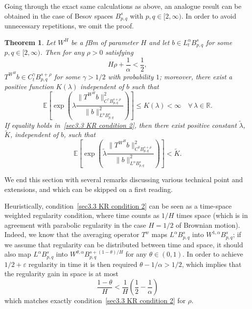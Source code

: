 \documentclass[10pt]{article}
\newtheorem{theorem}{Theorem}
\begin{document}
Going through the exact same calculations as above, an analogue result can be
obtained in the case of Besov spaces $B^s_{p, q}$ with $p, q \in [2, \infty)$.
In order to avoid unnecessary repetitions, we omit the proof.

\begin{theorem}
  \label{sec3.3 thm averaging besov}Let $W^H$ be a fBm of parameter $H$ and
  let $b \in L^{\alpha}_t B^s_{p, q}$ for some $p, q \in [2, \infty)$. Then
  for any $\rho > 0$ satisfying
  \begin{equation}
    H \rho + \frac{1}{\alpha} < \frac{1}{2}, \label{sec3.3 KR condition 2}
  \end{equation}
  $T^{W^H} b \in C^{\gamma}_t B^{s + \rho}_{p, q}$ for some $\gamma > 1 / 2$
  with probability $1$; moreover, there exist a positive function $K
  (\lambda)$ independent of $b$ such that
  \begin{equation}
    \mathbb{E} \left[ \exp \left( \lambda \frac{\| T^{W^H} b \|^2_{C^{\gamma}
    B_{p, q}^{s + \rho}}}{\| b \|_{L^{\alpha} B_{p, q}^s}^2} \right) \right]
    \leqslant K (\lambda) < \infty \quad \forall \, \lambda \in \mathbb{R}.
    \label{sec3.3 thm exp integrability besov}
  \end{equation}
  If equality holds in~{\eqref{sec3.3 KR condition 2}}, then there exist
  positive constant $\tilde{\lambda}$, $\tilde{K}$, independent of $b$, such
  that
  \begin{equation*}
    \mathbb{E} \left[ \exp \left( \widetilde{\lambda} \frac{\| T^{W^H} b
    \|^2_{C^0 B_{p, q}^{s + \rho}}}{\| b \|^2_{L^{\alpha} B_{p, q}^s}} \right)
    \right] < \tilde{K} .
  \end{equation*}
\end{theorem}

We end this section with several remarks discussing various technical point
and extensions, and which can be skipped on a first reading.

\begin{remark}
  Heuristically, condition~{\eqref{sec3.3 KR condition 2}} can be seen as a
  time-space weighted regularity condition, where time counts as $1 / H$ times
  space (which is in agreement with parabolic regularity in the case $H = 1 /
  2$ of Brownian motion). Indeed, we know that the averaging operator $T^w$
  maps $L^{\alpha} B^s_{p, q}$ into $W^{1, \alpha} B^s_{p, q}$; if we assume
  that regularity can be distributed between time and space, it should also
  map $L^{\alpha} B^s_{p, q}$ into $W^{\theta, \alpha} B^{s + (1 - \theta) /
  H}_{p, q}$ for any $\theta \in (0, 1)$. In order to achieve $1 / 2 +
  \varepsilon$ regularity in time it is then required $\theta - 1 / \alpha > 1
  / 2$, which implies that the regularity gain in space is at most
  \[ \frac{1 - \theta}{H} < \frac{1}{H} \left( \frac{1}{2} - \frac{1}{\alpha}
     \right) \]
  which matches exactly condition~{\eqref{sec3.3 KR condition 2}} for $\rho$.
\end{remark}
\end{document}
